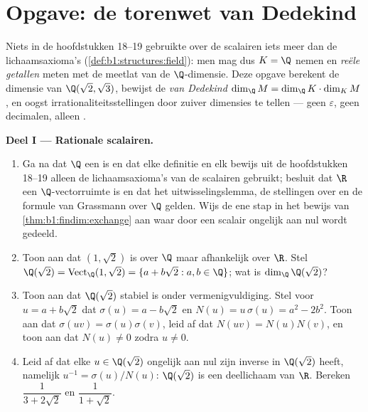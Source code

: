 \section{Opgave: de torenwet van Dedekind}

\begin{problem}\label{pb:b1:findim:1}
Niets in de hoofdstukken 18--19 gebruikte over de scalairen iets
meer dan de lichaamsaxioma's
(\cref{def:b1:structures:field}): men mag dus $K = \Q$ nemen en
 \emph{reële getallen} meten met de meetlat van de
$\Q$-dimensie. Deze opgave berekent de dimensie van $\Q(\sqrt2,
\sqrt3)$, bewijst de \emph{ van Dedekind} $\dim_\Q M =
\dim_\Q K \cdot \dim_K M$, en oogst
irrationaliteitsstellingen door zuiver dimensies te tellen --- geen
$\varepsilon$, geen decimalen, alleen .

\medskip
\noindent\textbf{Deel I --- Rationale scalairen.}
\begin{enumerate}
  \item Ga na dat $\Q$ een  is en dat elke definitie en elk
        bewijs uit de hoofdstukken 18--19 alleen de
        lichaamsaxioma's van de scalairen gebruikt; besluit dat $\R$
        een $\Q$-vectorruimte is en dat het uitwisselingslemma, de
        stellingen over  en de formule van Grassmann over $\Q$
        gelden. Wijs de ene stap in het bewijs van
        \cref{thm:b1:findim:exchange} aan waar door een scalair
        ongelijk aan nul wordt gedeeld.
  \item Toon aan dat $(1, \sqrt2)$  is over $\Q$ maar
        afhankelijk over $\R$. Stel $\Q(\sqrt2) =
        \operatorname{Vect}_\Q(1, \sqrt2) = \{a + b\sqrt2 : a, b \in
        \Q\}$; wat is $\dim_\Q \Q(\sqrt2)$?
  \item Toon aan dat $\Q(\sqrt2)$ stabiel is onder
        vermenigvuldiging. Stel voor $u = a + b\sqrt2$ dat
        $\sigma(u) = a - b\sqrt2$ en $N(u) = u\,\sigma(u) = a^2 -
        2b^2$. Toon aan dat $\sigma(uv) = \sigma(u)\sigma(v)$, leid
        af dat $N(uv) = N(u)N(v)$, en toon aan dat $N(u) \neq 0$
        zodra $u \neq 0$.
  \item Leid af dat elke $u \in \Q(\sqrt2)$ ongelijk aan nul zijn
        inverse in $\Q(\sqrt2)$ heeft, namelijk $u^{-1} =
        \sigma(u)/N(u)$: $\Q(\sqrt2)$ is een deellichaam van $\R$.
        Bereken $\dfrac1{3 + 2\sqrt2}$ en $\dfrac1{1 + \sqrt2}$.
\end{enumerate}


\end{problem}
